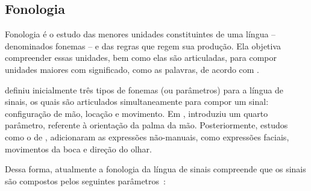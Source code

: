 \subsection{Fonologia}
\label{sec:linguistica-fonologia}

Fonologia é o estudo das menores unidades constituintes de uma língua -- denominados fonemas -- e das regras que regem sua produção. Ela objetiva compreender essas unidades, bem como elas são articuladas, para compor unidades maiores com significado, como as palavras, de acordo com . 


 definiu inicialmente três tipos de fonemas (ou parâmetros) para a língua de sinais, os quais são articulados simultaneamente para compor um sinal: configuração de mão, locação e movimento. Em \citeyear{battison-1974-phono-deletion}, \citeauthor{battison-1974-phono-deletion} introduziu um quarto parâmetro, referente à orientação da palma da mão. Posteriormente, estudos como o de , adicionaram as expressões não-manuais, como expressões faciais, movimentos da boca e direção do olhar.

Dessa forma, atualmente a fonologia da língua de sinais compreende que os sinais são compostos pelos seguintes parâmetros~\cite{stewart-2021-barrons-asl,jay-2011-dont-just-sign,quadros-2004-estudos-linguisticos}:

